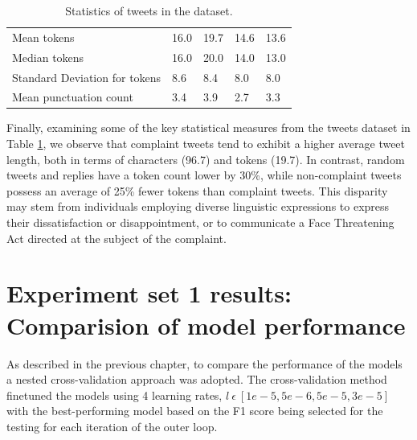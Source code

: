 \begin{table}[htbp]
\begin{tabularx}{\textwidth}{|l|X|X|X|X|}
        Mean tokens                     & 16.0                & 19.7                & 14.6                    & 13.6            \\
        \rowcolor[gray]{0.9}
        Median tokens                   & 16.0                & 20.0                & 14.0                    & 13.0            \\
        Standard Deviation for tokens   & 8.6                 & 8.4                 & 8.0                     & 8.0             \\
        \hline
        \hline
        Mean punctuation count          & 3.4                 & 3.9                 & 2.7                     & 3.3             \\
        \hline
    \end{tabularx}
    \caption{Statistics of tweets in the dataset.}
    \label{tab: tweets_statistics}
\end{table}

Finally, examining some of the key statistical measures from the tweets dataset in Table \ref{tab: tweets_statistics}, we observe that complaint tweets tend to exhibit a higher average tweet length, both in terms of characters (96.7) and tokens (19.7). In contrast, random tweets and replies have a token count lower by 30\%, while non-complaint tweets possess an average of 25\% fewer tokens than complaint tweets. This disparity may stem from individuals employing diverse linguistic expressions to express their dissatisfaction or disappointment, or to communicate a Face Threatening Act directed at the subject of the complaint.

\section{Experiment set 1 results: Comparision of model performance}
As described in the previous chapter, to compare the performance of the models a nested cross-validation approach was adopted. The cross-validation method finetuned the models using 4 learning rates, $l\:\epsilon\:[1e-5, 5e-6, 5e-5, 3e-5]$ with the best-performing model based on the F1 score being selected for the testing for each iteration of the outer loop. \\

